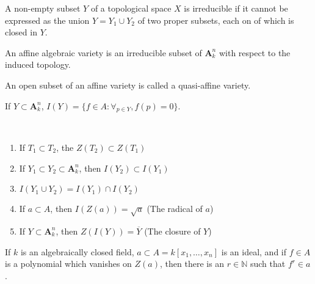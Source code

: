 \documentclass[crop=false,class=article,oneside]{standalone}
\begin{document}
            \begin{definition}
                A non-empty subset $Y$ of a topological space
                $X$ is irreducible if it cannot be expressed
                as the union $Y={Y_{1}}\cup{Y_{2}}$ of
                two proper subsets, each on of which is
                closed in $Y$.
            \end{definition}
            \begin{definition}
                An affine algebraic variety is an irreducible
                subset of $\textbf{A}_{k}^{n}$ with respect
                to the induced topology.
            \end{definition}
            \begin{definition}
                An open subset of an affine variety
                is called a quasi-affine variety.
            \end{definition}
            \begin{notation}
                If $Y\subset\textbf{A}_{k}^{n}$,
                $I(Y)=\{f\in A:\forall_{p\in Y},f(p)=0\}$.
            \end{notation}
            \begin{theorem}
                \
                \begin{enumerate}
                    \item If $T_1\subset T_2$,
                          the $Z(T_2)\subset{Z}(T_1)$
                    \item If
                          $Y_{1}\subset{Y_{2}}\subset%
                          \textbf{A}_{k}^{n}$,
                          then $I(Y_{2})\subset{I}(Y_{1})$
                    \item $I(Y_{1}\cup{Y_{2}})%
                           =I(Y_{1})\cap{I}(Y_{2})$
                    \item If $a\subset A$,
                          then $I(Z(a))=\sqrt{a}$
                          (The radical of $a$)
                    \item If $Y\subset\textbf{A}_{k}^{n}$,
                          then $Z(I(Y))=\overline{Y}$
                          (The closure of $Y$)
                \end{enumerate}
            \end{theorem}
            \begin{theorem}
                If $k$ is an algebraically closed field,
                $a\subset{A}=k[x_{1},\hdots,x_{n}]$
                is an ideal, and if $f\in{A}$ is a polynomial
                which vanishes on $Z(a)$, then there is an
                $r\in\mathbb{N}$ such that $f^{r}\in{a}$.
            \end{theorem}
\end{document}
